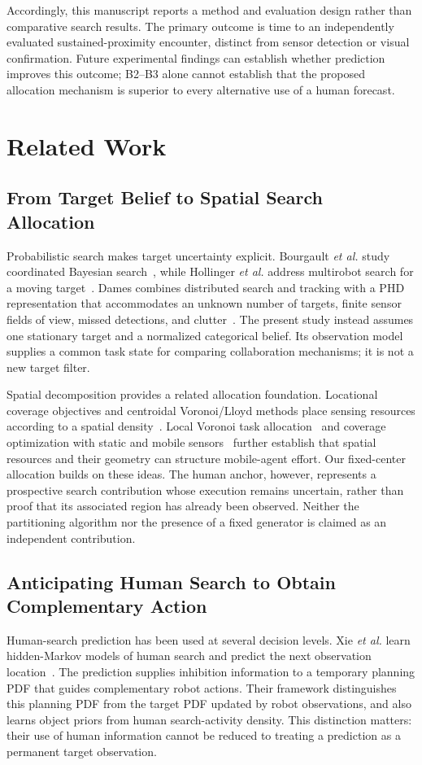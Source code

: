 \documentclass[conference]{IEEEtran}
\begin{document}
Accordingly, this manuscript reports a method and evaluation design rather than comparative search results. The primary outcome is time to an independently evaluated sustained-proximity encounter, distinct from sensor detection or visual confirmation. Future experimental findings can establish whether prediction improves this outcome; B2--B3 alone cannot establish that the proposed allocation mechanism is superior to every alternative use of a human forecast.

\section{Related Work}
\subsection{From Target Belief to Spatial Search Allocation}
Probabilistic search makes target uncertainty explicit. Bourgault \emph{et al.} study coordinated Bayesian search~\cite{b1}, while Hollinger \emph{et al.} address multirobot search for a moving target~\cite{Hollinger2009Efficient}. Dames combines distributed search and tracking with a PHD representation that accommodates an unknown number of targets, finite sensor fields of view, missed detections, and clutter~\cite{b7}. The present study instead assumes one stationary target and a normalized categorical belief. Its observation model supplies a common task state for comparing collaboration mechanisms; it is not a new target filter.

Spatial decomposition provides a related allocation foundation. Locational coverage objectives and centroidal Voronoi/Lloyd methods place sensing resources according to a spatial density~\cite{Cortes2004Coverage}. Local Voronoi task allocation~\cite{Fu2009LocalVoronoi} and coverage optimization with static and mobile sensors~\cite{Mahboubi2013StaticMobile} further establish that spatial resources and their geometry can structure mobile-agent effort. Our fixed-center allocation builds on these ideas. The human anchor, however, represents a prospective search contribution whose execution remains uncertain, rather than proof that its associated region has already been observed. Neither the partitioning algorithm nor the presence of a fixed generator is claimed as an independent contribution.

\subsection{Anticipating Human Search to Obtain Complementary Action}
Human-search prediction has been used at several decision levels. Xie \emph{et al.} learn hidden-Markov models of human search and predict the next observation location~\cite{Xie2011Intention}. The prediction supplies inhibition information to a temporary planning PDF that guides complementary robot actions. Their framework distinguishes this planning PDF from the target PDF updated by robot observations, and also learns object priors from human search-activity density. This distinction matters: their use of human information cannot be reduced to treating a prediction as a permanent target observation.
\end{document}
